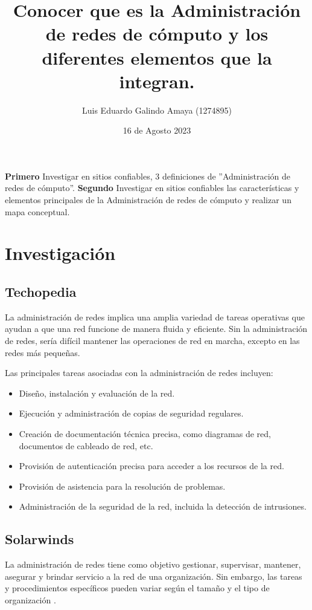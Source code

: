 \documentclass[11pt]{article}
\author{Luis Eduardo Galindo Amaya (1274895)}
\date{16 de Agosto 2023}
\title{Conocer que es la Administración de redes de cómputo y los diferentes elementos que la integran.}
\begin{document}

\textbf{Primero} Investigar en sitios confiables, 3 definiciones de ''Administración de
redes de cómputo''. \textbf{Segundo} Investigar en sitios confiables las características
y elementos principales de la Administración de redes de cómputo y realizar un 
mapa conceptual.

\section{Investigación}
\label{sec:orga749be7}
\subsection{Techopedia}
\label{sec:orgebf66fa}
\autocite{Rouse_2017} La administración de redes implica una amplia variedad de tareas operativas que 
ayudan a que una red funcione de manera fluida y eficiente. Sin la 
administración de redes, sería difícil mantener las operaciones de red en
marcha, excepto en las redes más pequeñas.

Las principales tareas asociadas con la administración de redes incluyen:

\begin{itemize}
\item Diseño, instalación y evaluación de la red.
\item Ejecución y administración de copias de seguridad regulares.
\item Creación de documentación técnica precisa, como diagramas de red, documentos de cableado de red, etc.
\item Provisión de autenticación precisa para acceder a los recursos de la red.
\item Provisión de asistencia para la resolución de problemas.
\item Administración de la seguridad de la red, incluida la detección de intrusiones.
\end{itemize}

\subsection{Solarwinds}
\label{sec:org4fb5ed1}
\autocite{unknown_2020} La administración de redes tiene como objetivo gestionar, supervisar, mantener,
asegurar y brindar servicio a la red de una organización. Sin embargo, las
tareas y procedimientos específicos pueden variar según el tamaño y el tipo
de organización . 
\end{document}
